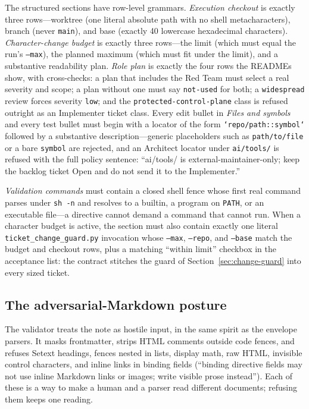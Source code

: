 \documentclass[10pt,aps,prd,twocolumn,nofootinbib]{revtex4-2}
\newcommand{\code}[1]{\texttt{#1}}
\newcommand{\file}[1]{\texttt{#1}}
\begin{document}
The structured sections have row-level grammars.  \emph{Execution
checkout} is exactly three rows---worktree (one literal absolute path
with no shell metacharacters), branch (never \code{main}), and base
(exactly 40 lowercase hexadecimal characters).  \emph{Character-change
budget} is exactly three rows---the limit (which must equal the run's
\code{--max}), the planned maximum (which must fit under the limit),
and a substantive readability plan.  \emph{Role plan} is exactly the
four rows the READMEs show, with cross-checks: a plan that includes
the Red Team must select a real severity and scope; a plan without one
must say \code{not-used} for both; a \code{widespread} review forces
severity \code{low}; and the \code{protected-control-plane} class is
refused outright as an Implementer ticket class.  Every edit bullet in
\emph{Files and symbols} and every test bullet must begin with a
locator of the form
\code{`repo/path::symbol`}
followed by a substantive description---generic placeholders such as
\code{path/to/file} or a bare \code{symbol} are rejected, and an
Architect locator under \file{ai/tools/} is refused with the full
policy sentence: ``ai/tools/ is external-maintainer-only; keep the
backlog ticket Open and do not send it to the Implementer.''

\emph{Validation commands} must contain a closed shell fence whose
first real command parses under \code{sh -n} and resolves to a
builtin, a program on \code{PATH}, or an executable file---a directive
cannot demand a command that cannot run.  When a character budget is
active, the section must also contain exactly one literal
\file{ticket\_change\_guard.py} invocation whose \code{--max},
\code{--repo}, and \code{--base} match the budget and checkout rows,
plus a matching ``within limit'' checkbox in the acceptance list: the
contract stitches the guard of Section~\ref{sec:change-guard} into
every sized ticket.

\subsection{The adversarial-Markdown posture}

The validator treats the note as hostile input, in the same spirit as
the envelope parsers.  It masks frontmatter, strips HTML comments
outside code fences, and refuses Setext headings, fences nested in
lists, display math, raw HTML, invisible control characters, and
inline links in binding fields (``binding directive fields may not use
inline Markdown links or images; write visible prose instead'').  Each
of these is a way to make a human and a parser read different
documents; refusing them keeps one reading.
\end{document}
